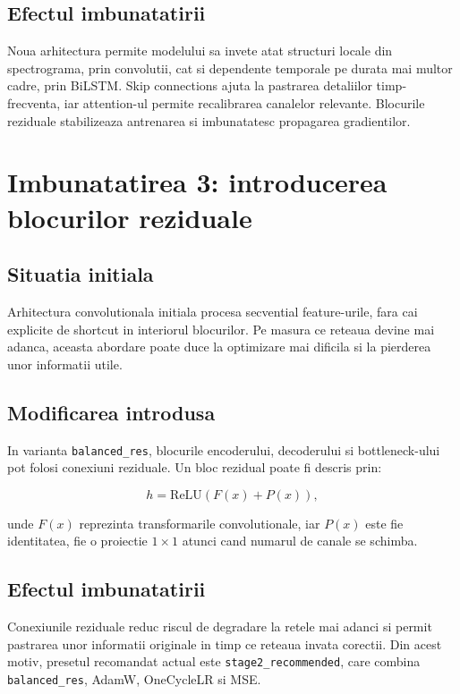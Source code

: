\documentclass[12pt,a4paper]{article}
\begin{document}
\subsection{Efectul imbunatatirii}

Noua arhitectura permite modelului sa invete atat structuri locale din
spectrograma, prin convolutii, cat si dependente temporale pe durata mai multor
cadre, prin BiLSTM. Skip connections ajuta la pastrarea detaliilor
timp-frecventa, iar attention-ul permite recalibrarea canalelor relevante.
Blocurile reziduale stabilizeaza antrenarea si imbunatatesc propagarea
gradientilor.

\section{Imbunatatirea 3: introducerea blocurilor reziduale}

\subsection{Situatia initiala}

Arhitectura convolutionala initiala procesa secvential feature-urile, fara cai
explicite de shortcut in interiorul blocurilor. Pe masura ce reteaua devine mai
adanca, aceasta abordare poate duce la optimizare mai dificila si la pierderea
unor informatii utile.

\subsection{Modificarea introdusa}

In varianta \texttt{balanced\_res}, blocurile encoderului, decoderului si
bottleneck-ului pot folosi conexiuni reziduale. Un bloc rezidual poate fi descris
prin:

\begin{equation}
    h = \mathrm{ReLU}(F(x) + P(x)),
\end{equation}

unde $F(x)$ reprezinta transformarile convolutionale, iar $P(x)$ este fie
identitatea, fie o proiectie $1 \times 1$ atunci cand numarul de canale se schimba.

\subsection{Efectul imbunatatirii}

Conexiunile reziduale reduc riscul de degradare la retele mai adanci si permit
pastrarea unor informatii originale in timp ce reteaua invata corectii. Din acest
motiv, presetul recomandat actual este \texttt{stage2\_recommended}, care combina
\texttt{balanced\_res}, AdamW, OneCycleLR si MSE.
\end{document}
